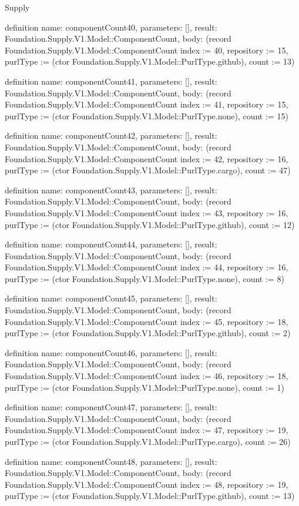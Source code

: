 \begin{lexlean}{Supply}
\begin{semanticmodule}
definition{
  name: componentCount40,
  parameters: [],
  result: Foundation.Supply.V1.Model::ComponentCount,
  body: (record Foundation.Supply.V1.Model::ComponentCount {index := 40, repository := 15, purlType := (ctor Foundation.Supply.V1.Model::PurlType.github), count := 13})
}

definition{
  name: componentCount41,
  parameters: [],
  result: Foundation.Supply.V1.Model::ComponentCount,
  body: (record Foundation.Supply.V1.Model::ComponentCount {index := 41, repository := 15, purlType := (ctor Foundation.Supply.V1.Model::PurlType.none), count := 15})
}

definition{
  name: componentCount42,
  parameters: [],
  result: Foundation.Supply.V1.Model::ComponentCount,
  body: (record Foundation.Supply.V1.Model::ComponentCount {index := 42, repository := 16, purlType := (ctor Foundation.Supply.V1.Model::PurlType.cargo), count := 47})
}

definition{
  name: componentCount43,
  parameters: [],
  result: Foundation.Supply.V1.Model::ComponentCount,
  body: (record Foundation.Supply.V1.Model::ComponentCount {index := 43, repository := 16, purlType := (ctor Foundation.Supply.V1.Model::PurlType.github), count := 12})
}

definition{
  name: componentCount44,
  parameters: [],
  result: Foundation.Supply.V1.Model::ComponentCount,
  body: (record Foundation.Supply.V1.Model::ComponentCount {index := 44, repository := 16, purlType := (ctor Foundation.Supply.V1.Model::PurlType.none), count := 8})
}

definition{
  name: componentCount45,
  parameters: [],
  result: Foundation.Supply.V1.Model::ComponentCount,
  body: (record Foundation.Supply.V1.Model::ComponentCount {index := 45, repository := 18, purlType := (ctor Foundation.Supply.V1.Model::PurlType.github), count := 2})
}

definition{
  name: componentCount46,
  parameters: [],
  result: Foundation.Supply.V1.Model::ComponentCount,
  body: (record Foundation.Supply.V1.Model::ComponentCount {index := 46, repository := 18, purlType := (ctor Foundation.Supply.V1.Model::PurlType.none), count := 1})
}

definition{
  name: componentCount47,
  parameters: [],
  result: Foundation.Supply.V1.Model::ComponentCount,
  body: (record Foundation.Supply.V1.Model::ComponentCount {index := 47, repository := 19, purlType := (ctor Foundation.Supply.V1.Model::PurlType.cargo), count := 26})
}

definition{
  name: componentCount48,
  parameters: [],
  result: Foundation.Supply.V1.Model::ComponentCount,
  body: (record Foundation.Supply.V1.Model::ComponentCount {index := 48, repository := 19, purlType := (ctor Foundation.Supply.V1.Model::PurlType.github), count := 13})
}


\end{semanticmodule}
\end{lexlean}
